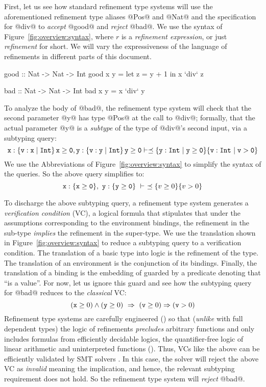 First, let us see how standard refinement type systems 
\cite{LiquidPLDI08, Knowles10} will 
use
the aforementioned refinement type aliases @Pos@ and @Nat@ 
and the specification for @div@
%
to \emph{accept} @good@ and
\emph{reject} @bad@.
We use the syntax of Figure~\ref{fig:overview:syntax}, where $r$ is a
\emph{refinement expression}, or just \emph{refinement} for short.
We will vary the expressiveness of the language of refinements in
different parts of this document.
%
\begin{code}
    good     :: Nat -> Nat -> Int
    good x y = let z = y + 1 in x `div` z

    bad      :: Nat -> Nat -> Int
    bad x y  = x `div` y
\end{code}

To analyze the body of @bad@, the refinement type system will 
check that the second parameter @y@ has type @Pos@ at the call 
to @div@; formally, that %
the actual parameter @y@ is a \emph{subtype} of the type of 
@div@'s second input, via a subtyping query:
%
$$
 \mathtt{x}:\mathtt{\left\lbrace v : x\mid Int\right\rbrace{}{x \geq 0}}, 
 \mathtt{y}:\mathtt{\left\lbrace v : y\mid Int\right\rbrace{}{y \geq 0}}
 \vdash
 \preceq{\ensuremath{{\{ \mathtt{y}:\mathtt{Int^{}} \mid \mathtt{y \geq 0} \}}}}{\ensuremath{{\{ \mathtt{v}:\mathtt{Int^{}} \mid \mathtt{v > 0} \}}}}$$
%
We use the Abbreviations of Figure~\ref{fig:overview:syntax} to simplify the 
syntax of the queries.
%
So the above query simplifies to:
$$\ttbind{x}{\ttref{x \geq 0}},\ \ttbind{y}{\ttref{y \geq 0}}\ \vdash\ \subtref{v \geq 0}{v > 0}$$

To discharge the above subtyping query, a refinement type system
generates a \emph{verification condition} (VC), a logical formula 
that stipulates that under the assumptions corresponding to the 
environment bindings, the refinement in the sub-type \emph{implies} 
the refinement in the super-type.
%
We use the translation \embed{\cdot} shown in Figure~\ref{fig:overview:syntax}
to reduce a subtyping query to a verification condition.
%
The translation of a basic type into logic is the refinement of the type.
The translation of an environment is the conjunction of its bindings.
Finally, the translation of a binding \ttbind{\x}{\typ} is the embedding of \typ 
guarded by a predicate denoting that ``\x is a value''.
%
For now, let us ignore this guard and see how the subtyping query for 
@bad@ reduces to the \emph{classical} VC:
$$(\mathtt{x} \geq 0) \wedge (\mathtt{y} \geq 0)\ \Rightarrow\ (\mathtt{v} \geq 0) \Rightarrow (\mathtt{v} > 0)$$
Refinement type systems are carefully engineered () 
so that (\emph{unlike} with full dependent types) the logic of 
refinements \emph{precludes} arbitrary functions and only includes 
formulas from efficiently decidable logics, \eg the quantifier-free 
logic of linear arithmetic and uninterpreted functions (\logiclang).
Thus, VCs like the above can be efficiently validated by SMT 
solvers \cite{z3}. 
%
In this case, the solver will reject the above VC as \emph{invalid} meaning the 
implication, and hence, the relevant subtyping requirement does not hold.
So the refinement type system will \emph{reject} @bad@.

